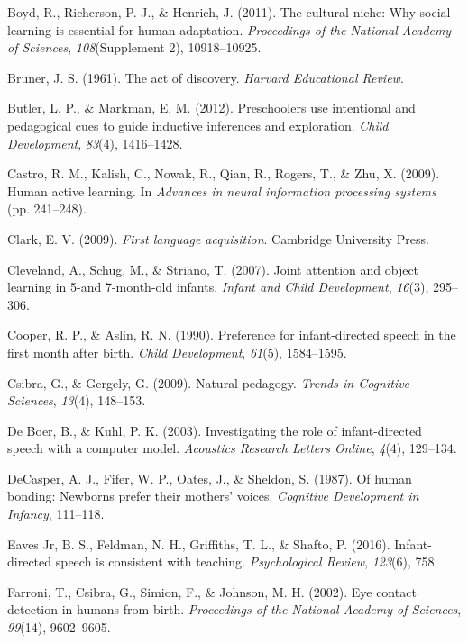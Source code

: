 \documentclass[a4paper,man,apacite,floatsintext]{apa6}
\begin{document}
\hypertarget{ref-boyd2011cultural}{}
Boyd, R., Richerson, P. J., \& Henrich, J. (2011). The cultural niche:
Why social learning is essential for human adaptation. \emph{Proceedings
of the National Academy of Sciences}, \emph{108}(Supplement 2),
10918--10925.

\hypertarget{ref-bruner1961act}{}
Bruner, J. S. (1961). The act of discovery. \emph{Harvard Educational
Review}.

\hypertarget{ref-butler2012preschoolers}{}
Butler, L. P., \& Markman, E. M. (2012). Preschoolers use intentional
and pedagogical cues to guide inductive inferences and exploration.
\emph{Child Development}, \emph{83}(4), 1416--1428.

\hypertarget{ref-castro2009human}{}
Castro, R. M., Kalish, C., Nowak, R., Qian, R., Rogers, T., \& Zhu, X.
(2009). Human active learning. In \emph{Advances in neural information
processing systems} (pp. 241--248).

\hypertarget{ref-clark2009first}{}
Clark, E. V. (2009). \emph{First language acquisition}. Cambridge
University Press.

\hypertarget{ref-cleveland2007joint}{}
Cleveland, A., Schug, M., \& Striano, T. (2007). Joint attention and
object learning in 5-and 7-month-old infants. \emph{Infant and Child
Development}, \emph{16}(3), 295--306.

\hypertarget{ref-cooper1990preference}{}
Cooper, R. P., \& Aslin, R. N. (1990). Preference for infant-directed
speech in the first month after birth. \emph{Child Development},
\emph{61}(5), 1584--1595.

\hypertarget{ref-csibra2009natural}{}
Csibra, G., \& Gergely, G. (2009). Natural pedagogy. \emph{Trends in
Cognitive Sciences}, \emph{13}(4), 148--153.

\hypertarget{ref-de2003investigating}{}
De Boer, B., \& Kuhl, P. K. (2003). Investigating the role of
infant-directed speech with a computer model. \emph{Acoustics Research
Letters Online}, \emph{4}(4), 129--134.

\hypertarget{ref-decasper1987human}{}
DeCasper, A. J., Fifer, W. P., Oates, J., \& Sheldon, S. (1987). Of
human bonding: Newborns prefer their mothers' voices. \emph{Cognitive
Development in Infancy}, 111--118.

\hypertarget{ref-eaves2016infant}{}
Eaves Jr, B. S., Feldman, N. H., Griffiths, T. L., \& Shafto, P. (2016).
Infant-directed speech is consistent with teaching. \emph{Psychological
Review}, \emph{123}(6), 758.

\hypertarget{ref-farroni2002eye}{}
Farroni, T., Csibra, G., Simion, F., \& Johnson, M. H. (2002). Eye
contact detection in humans from birth. \emph{Proceedings of the
National Academy of Sciences}, \emph{99}(14), 9602--9605.
\end{document}
